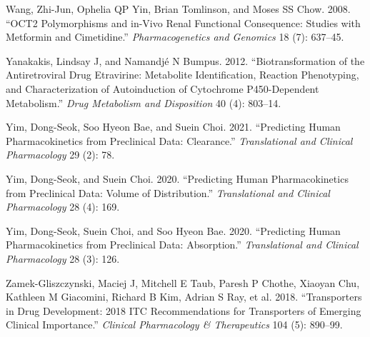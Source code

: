 \documentclass[
  11pt,
  krantz2, a4paper, twoside]{krantz}
\begin{document}
\begin{CSLReferences}
Wang, Zhi-Jun, Ophelia QP Yin, Brian Tomlinson, and Moses SS Chow. 2008. {``OCT2 Polymorphisms and in-Vivo Renal Functional Consequence: Studies with Metformin and Cimetidine.''} \emph{Pharmacogenetics and Genomics} 18 (7): 637--45.

Yanakakis, Lindsay J, and Namandjé N Bumpus. 2012. {``Biotransformation of the Antiretroviral Drug Etravirine: Metabolite Identification, Reaction Phenotyping, and Characterization of Autoinduction of Cytochrome P450-Dependent Metabolism.''} \emph{Drug Metabolism and Disposition} 40 (4): 803--14.

Yim, Dong-Seok, Soo Hyeon Bae, and Suein Choi. 2021. {``Predicting Human Pharmacokinetics from Preclinical Data: Clearance.''} \emph{Translational and Clinical Pharmacology} 29 (2): 78.

Yim, Dong-Seok, and Suein Choi. 2020. {``Predicting Human Pharmacokinetics from Preclinical Data: Volume of Distribution.''} \emph{Translational and Clinical Pharmacology} 28 (4): 169.

Yim, Dong-Seok, Suein Choi, and Soo Hyeon Bae. 2020. {``Predicting Human Pharmacokinetics from Preclinical Data: Absorption.''} \emph{Translational and Clinical Pharmacology} 28 (3): 126.

Zamek-Gliszczynski, Maciej J, Mitchell E Taub, Paresh P Chothe, Xiaoyan Chu, Kathleen M Giacomini, Richard B Kim, Adrian S Ray, et al. 2018. {``Transporters in Drug Development: 2018 ITC Recommendations for Transporters of Emerging Clinical Importance.''} \emph{Clinical Pharmacology \& Therapeutics} 104 (5): 890--99.

\end{CSLReferences}

\printindex
\end{document}
